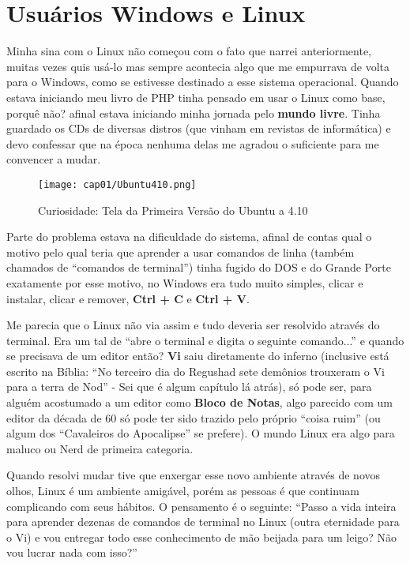 \section{Usuários Windows e Linux}
Minha sina com o Linux não começou com o fato que narrei anteriormente, muitas vezes quis usá-lo mas sempre acontecia algo que me empurrava de volta para o Windows, como se estivesse destinado a esse sistema operacional. Quando estava iniciando meu livro de PHP tinha pensado em usar o Linux como base, porquê não? afinal estava iniciando minha jornada pelo \textbf{mundo livre}. Tinha guardado os CDs de diversas distros (que vinham em revistas de informática) e devo confessar que na época nenhuma delas me agradou o suficiente para me convencer a mudar.
\begin{figure}[H]
\centering\texttt{[image: cap01/Ubuntu410.png]}
\caption{Curiosidade: Tela da Primeira Versão do Ubuntu a 4.10}
\end{figure}

Parte do problema estava na dificuldade do sistema, afinal de contas qual o motivo pelo qual teria que aprender a usar comandos de linha (também chamados de ``comandos de terminal'') tinha fugido do DOS e do Grande Porte exatamente por esse motivo, no Windows era tudo muito simples, clicar e instalar, clicar e remover, \textbf{Ctrl + C} e \textbf{Ctrl + V}.

Me parecia que o Linux não via assim e tudo deveria ser resolvido através do terminal. Era um tal de ``abre o terminal e digita o seguinte comando...'' e quando se precisava de um editor então? \textbf{Vi} saiu diretamente do inferno (inclusive está escrito na Bíblia: ``No terceiro dia do Regushad sete demônios trouxeram o Vi para a terra de Nod'' - Sei que é algum capítulo lá atrás), só pode ser, para alguém acostumado a um editor como \textbf{Bloco de Notas}, algo parecido com um editor da década de 60 só pode ter sido trazido pelo próprio ``coisa ruim'' (ou algum dos ``Cavaleiros do Apocalipse'' se prefere). O mundo Linux era algo para maluco ou Nerd de primeira categoria.

Quando resolvi mudar tive que enxergar esse novo ambiente através de novos olhos, Linux é um ambiente amigável, porém as pessoas é que continuam complicando com seus hábitos. O pensamento é o seguinte: ``Passo a vida inteira para aprender dezenas de comandos de terminal no Linux (outra eternidade para o Vi) e vou entregar todo esse conhecimento de mão beijada para um leigo? Não vou lucrar nada com isso?''

